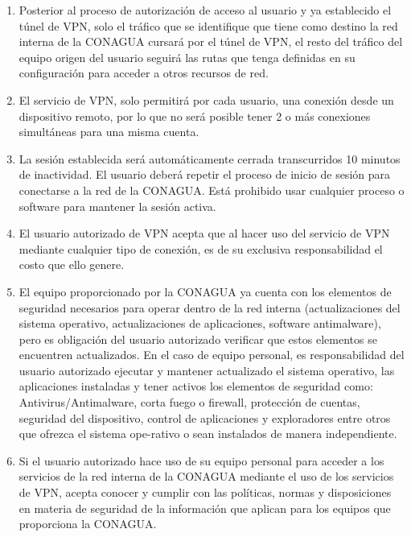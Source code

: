 \documentclass[letterpaper,11pt]{article}
\begin{document}
{\begin{enumerate}
              proporcionar a terceros su contraseña y no permitir el acceso a su cuenta de correo electrónico 
              para la obtención de la clave de 6 dígitos a terceros.
	\item Posterior al proceso de autorización de acceso al usuario y ya establecido el túnel de VPN, 
              solo el tráfico que se identifique que tiene como destino la red interna de la CONAGUA cursará 
              por el túnel de VPN, el resto del tráfico del equipo origen del usuario seguirá las rutas que tenga 
              definidas en su configuración para acceder a otros recursos de red.
	\item El servicio de VPN, solo permitirá por cada usuario, una conexión desde un dispositivo remoto,
               por lo que no será posible tener 2 o más conexiones simultáneas para una misma cuenta.
	\item  La sesión establecida será automáticamente cerrada transcurridos 10 minutos de inactividad. 
              El usuario deberá repetir el proceso de inicio de sesión para conectarse a la red de la CONAGUA. 
              Está prohibido usar cualquier proceso o software para mantener la sesión activa.
           \item El usuario autorizado de VPN acepta que al hacer uso del servicio de VPN mediante cualquier 
              tipo de conexión, es de su exclusiva responsabilidad el costo que ello genere.
            \item El equipo proporcionado por la CONAGUA ya cuenta con los elementos de seguridad necesarios para 
              operar dentro de la red interna (actualizaciones del sistema operativo, actualizaciones de aplicaciones, 
              software antimalware), pero es obligación del usuario autorizado verificar que estos elementos se encuentren 
              actualizados. En el caso de equipo personal, es responsabilidad del usuario autorizado ejecutar y mantener 
              actualizado el sistema operativo, las aplicaciones instaladas y tener activos los elementos de seguridad como: 
              Antivirus/Antimalware, corta fuego o firewall, protección de cuentas, seguridad del dispositivo, control de 
              aplicaciones y exploradores entre otros que ofrezca el sistema ope-rativo o sean instalados de manera 				independiente.
	\item Si el usuario autorizado hace uso de su equipo personal para acceder a los servicios de la red interna de 
              la CONAGUA mediante el uso de los servicios de VPN, acepta conocer y cumplir con las políticas, normas y disposiciones en materia de seguridad de la información que aplican para los equipos que proporciona la CONAGUA.
\end{enumerate}}
\end{document}
